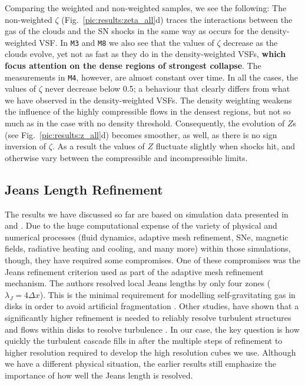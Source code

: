 Comparing the weighted and non-weighted samples, we see the following:
The non-weighted $\zeta$ (Fig.~\ref{pic:results:zeta_all}d) traces the interactions between the gas of the clouds and the SN shocks in the same way as occurs for the density-weighted VSF.
In \texttt{M3} and \texttt{M8} we also see that the values of $\zeta$ decrease as the clouds evolve, yet not as fast as they do in the density-weighted VSFs, \textbf{which focus attention on the dense regions of strongest collapse}. 
The measurements in \texttt{M4}, however, are almost constant over time. 
In all the cases, the values of $\zeta$ never decrease below 0.5; a behaviour that clearly differs from what we have observed in the density-weighted VSFs. 
The density weighting weakens the influence of the highly compressible flows in the densest regions, but not so much as in the case with no density threshold. 
Consequently, the evolution of $Z$s (see Fig.~\ref{pic:results:z_all}d) becomes smoother, as well, as there is no sign inversion of $\zeta$.
As a result the values of $Z$ fluctuate slightly when shocks hit, and otherwise vary between the compressible and incompressible limits.



\subsection{Jeans Length Refinement}\label{results:refinement}

The results we have discussed so far are based on simulation data presented in  and .
Due to the huge computational expense of the variety of physical and numerical processes (fluid dynamics, adaptive mesh refinement, SNe, magnetic fields, radiative heating and cooling, and many more) within those simulations, though, they have required some compromises.
One of these compromises was the Jeans refinement criterion used as part of the adaptive mesh refinement mechanism.
The authors resolved local Jeans lengths by only four zones ($\lambda_J=4\Delta x$).
This is the minimal requirement for modelling self-gravitating gas in disks in order to avoid artificial fragmentation \citep{Truelove1998}. 
Other studies, have shown that a significantly higher refinement is needed to reliably resolve turbulent structures and flows within disks to resolve turbulence \citep{Federrath2011, Turk2012}.  
In our case, the key question is how quickly the turbulent cascade fills in after the multiple steps of refinement to higher resolution required to develop the high resolution cubes we use.  
Although we have a different physical situation, the earlier results still emphasize the importance of how well the Jeans length is resolved.

